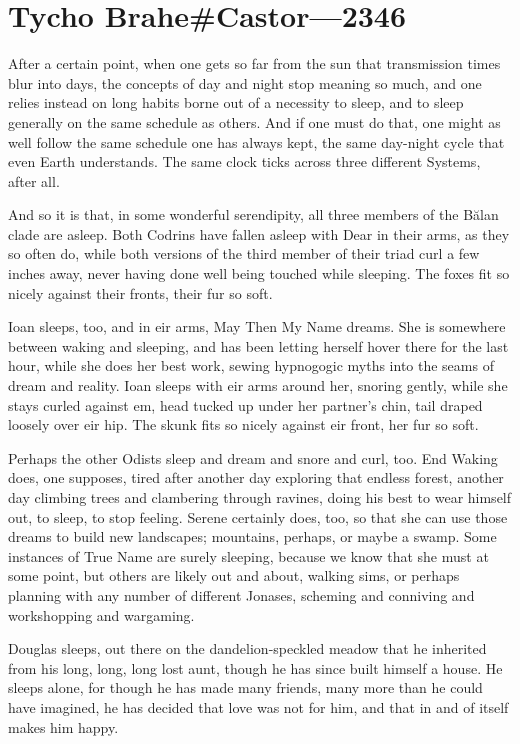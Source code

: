 \hypertarget{tycho-brahecastor-2346}{%
\chapter{Tycho Brahe\#Castor—2346}\label{tycho-brahecastor-2346}}

After a certain point, when one gets so far from the sun that transmission times blur into days, the concepts of day and night stop meaning so much, and one relies instead on long habits borne out of a necessity to sleep, and to sleep generally on the same schedule as others. And if one must do that, one might as well follow the same schedule one has always kept, the same day-night cycle that even Earth understands. The same clock ticks across three different Systems, after all.

And so it is that, in some wonderful serendipity, all three members of the Bălan clade are asleep. Both Codrins have fallen asleep with Dear in their arms, as they so often do, while both versions of the third member of their triad curl a few inches away, never having done well being touched while sleeping. The foxes fit so nicely against their fronts, their fur so soft.

Ioan sleeps, too, and in eir arms, May Then My Name dreams. She is somewhere between waking and sleeping, and has been letting herself hover there for the last hour, while she does her best work, sewing hypnogogic myths into the seams of dream and reality. Ioan sleeps with eir arms around her, snoring gently, while she stays curled against em, head tucked up under her partner's chin, tail draped loosely over eir hip. The skunk fits so nicely against eir front, her fur so soft.

Perhaps the other Odists sleep and dream and snore and curl, too. End Waking does, one supposes, tired after another day exploring that endless forest, another day climbing trees and clambering through ravines, doing his best to wear himself out, to sleep, to stop feeling. Serene certainly does, too, so that she can use those dreams to build new landscapes; mountains, perhaps, or maybe a swamp. Some instances of True Name are surely sleeping, because we know that she must at some point, but others are likely out and about, walking sims, or perhaps planning with any number of different Jonases, scheming and conniving and workshopping and wargaming.

Douglas sleeps, out there on the dandelion-speckled meadow that he inherited from his long, long, long lost aunt, though he has since built himself a house. He sleeps alone, for though he has made many friends, many more than he could have imagined, he has decided that love was not for him, and that in and of itself makes him happy.

